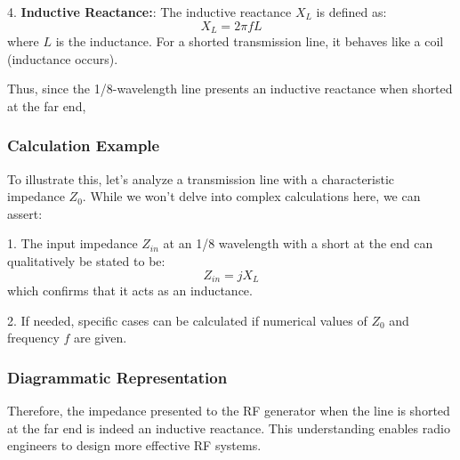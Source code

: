 4. \textbf{Inductive Reactance:}: The inductive reactance \( X_L \) is defined as:
   \[
   X_L = 2 \pi f L
   \]
   where \( L \) is the inductance. For a shorted transmission line, it behaves like a coil (inductance occurs).

Thus, since the 1/8-wavelength line presents an inductive reactance when shorted at the far end, 

\subsubsection{Calculation Example}

To illustrate this, let's analyze a transmission line with a characteristic impedance \( Z_0 \). While we won't delve into complex calculations here, we can assert:

1. The input impedance \( Z_{in} \) at an 1/8 wavelength with a short at the end can qualitatively be stated to be:
\[
Z_{in} = jX_L
\]
which confirms that it acts as an inductance.

2. If needed, specific cases can be calculated if numerical values of \( Z_0 \) and frequency \( f \) are given.

\subsubsection{Diagrammatic Representation}

\begin{center}
\end{center}

Therefore, the impedance presented to the RF generator when the line is shorted at the far end is indeed an inductive reactance. This understanding enables radio engineers to design more effective RF systems.
